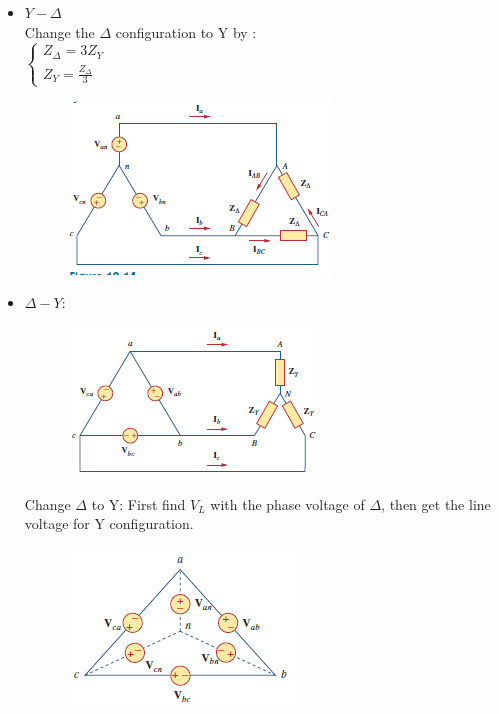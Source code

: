 \documentclass[10pt,landscape]{article}
\theoremstyle{definition}
\theoremstyle{remark}
\begin{document}
\begin{multicols}{3}
\begin{itemize}[noitemsep,nolistsep]
    \item $Y - \Delta$ \\
    Change the $\Delta$ configuration to Y by : \\
    $
    \begin{cases}
    Z_{\Delta} = 3Z_Y \\
    Z_Y = \frac{Z_{\Delta}}{3}
    \end{cases}
    $
    
    
\begin{figure}[H]
    \centering
    \includegraphics[width=0.5\linewidth]{202/figure/y-d.png}
    \caption{}
    \label{fig:y-d}
\end{figure}

    \item $\Delta - Y$: \\

\begin{figure}[H]
    \centering
    \includegraphics[width=0.5\linewidth]{202/figure/d-y.png}
    \caption{}
    \label{fig:d-y}
\end{figure}

    Change $\Delta$ to Y: First find $V_L$ with the phase voltage of $\Delta$, then get the line voltage for Y configuration.  
    
\begin{figure}[H]
    \centering
    \includegraphics[width=0.5\linewidth]{202/figure/d_source_to_y.png}
    \caption{}
    \label{fig:ds_2_y}
\end{figure}


\end{itemize}
\end{multicols}
\end{document}
